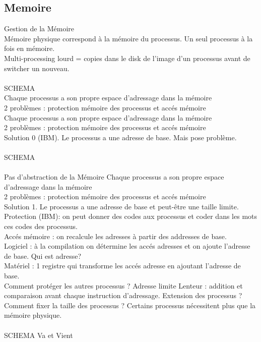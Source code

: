 \documentclass[5pt]{article}
\begin{document}
\begin{scriptsize}
\subsection{Memoire}
Gestion de la Mémoire\\
Mémoire physique correspond à la mémoire du processus. Un seul processus à la fois en mémoire.\\
Multi-processing lourd = copies dans le disk de l’image d’un processus avant de switcher un nouveau.\\
\\SCHEMA\\
Chaque processus a son propre espace d’adressage dans la mémoire\\
2 problèmes : protection mémoire des processus et accés mémoire\\
Chaque processus a son propre espace d’adressage dans la mémoire\\
2 problèmes : protection mémoire des processus et accés mémoire\\
Solution 0 (IBM). Le processus a une adresse de base. Mais pose problème.\\
\\SCHEMA\\
\\
Pas d’abstraction de la Mémoire Chaque processus a son propre espace d’adressage dans la mémoire\\
2 problèmes : protection mémoire des processus et accés mémoire\\
Solution 1. Le processus a une adresse de base et peut-être une taille limite. Protection (IBM): on peut donner des codes aux processus et coder dans les mots ces codes des processus.\\
Accés mémoire : on recalcule les adresses à partir des addresses de base.\\
Logiciel : à la compilation on détermine les accés adresses et on ajoute l’adresse de base. Qui est adresse?\\
Matériel : 1 registre qui transforme les accés adresse en ajoutant l’adresse de base.\\
Comment protéger les autres processus ? Adresse limite Lenteur : addition et comparaison avant chaque instruction d’adressage. Extension des processus ? Comment fixer la taille des processus ? Certains processus nécessitent plus que la mémoire physique.\\
\\SCHEMA Va et Vient\\
\\

\end{scriptsize}
\end{document}
